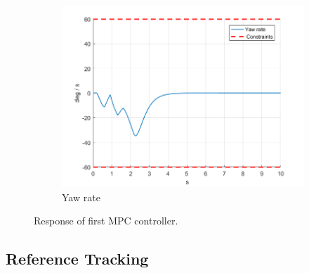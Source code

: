 \documentclass[11pt]{article}
\begin{document}
\begin{enumerate}
\begin{figure}[ht]
\begin{subfigure}[c]{0.3\linewidth}
            \includegraphics[width=\linewidth]{Plots_03_FirstMPCController/06}
            \caption{Yaw rate}
        \end{subfigure}
        \caption{Response of first MPC controller.}
        \label{fig:1st_mpc_controller}
    \end{figure}
\end{enumerate}



\subsection*{Reference Tracking} %
\label{sub:reference_tracking}
\end{document}

